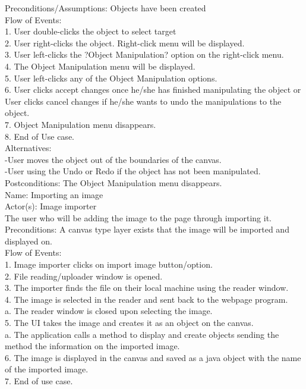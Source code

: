 \documentclass[12pt]{report}
\begin{document}
Preconditions/Assumptions: Objects have been created\\[1\baselineskip]
Flow of Events: \\
1. User double-clicks the object to select target\\
2. User right-clicks the object. Right-click menu will be displayed.\\
3. User left-clicks the ?Object Manipulation? option on the right-click menu.\\
4. The Object Manipulation menu will be displayed. \\
5. User left-clicks any of the Object Manipulation options.\\
6. User clicks accept changes once he/she has finished manipulating the object or User clicks cancel changes if he/she wants to undo the manipulations to the object.\\
7. Object Manipulation menu disappears.\\
8. End of Use case.\\[1\baselineskip]
Alternatives:\\
-User moves the object out of the boundaries of the canvas.\\
-User using the Undo or Redo if the object has not been manipulated. \\[1\baselineskip]
Postconditions: The Object Manipulation menu disappears.\\[2\baselineskip]

Name: Importing an image\\
Actor(s): Image importer\\
The user who will be adding the image to the page through importing it.\\
Preconditions: A canvas type layer exists that the image will be imported and displayed on.\\[0\baselineskip]

Flow of Events:\\
1.       Image importer clicks on import image button/option.\\
2.       File reading/uploader window is opened.\\
3.       The importer finds the file on their local machine using the reader window.\\
4.       The image is selected in the reader and sent back to the webpage program.\\
a.       The reader window is closed upon selecting the image.\\
5.        The UI takes the image and creates it as an object on the canvas.\\
a.       The application calls a method to display and create objects sending the method the information on the imported image.\\
6.       The image is displayed in the canvas and saved as a java object with the name of the imported image. \\
7.       End of use case.\\[0\baselineskip]
\end{document}
